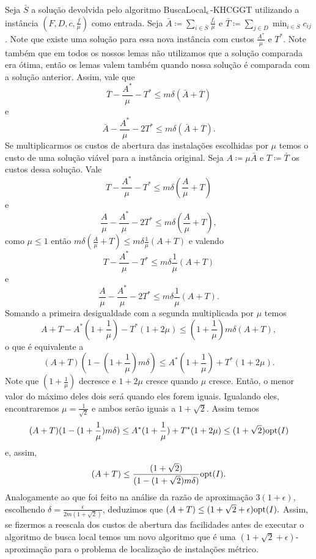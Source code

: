 Seja $\bar{S}$ a solução devolvida pelo algoritmo {\sc BuscaLocal$_\epsilon$-KHCGGT} utilizando a instância $(F,D,c,\frac{f}{\mu})$ como entrada. Seja $\bar{A} \coloneqq \sum_{i \in \bar{S}} \frac{f_i}{\mu}$ e $\bar{T} \coloneqq \sum_{j\in D} \min_{i \in \bar{S}} c_{ij}$. Note que existe uma solução para essa nova instância com custos $\frac{A^*}{\mu}$ e $T^*$. Note também que em todos os nossos lemas não utilizamos  que a solução comparada era ótima, então os lemas valem também quando nossa solução é comparada com a solução anterior. Assim, vale que
\[ \overline{T} - \frac{A^*}{\mu} - T^* \leq m\delta(\bar{A} + \overline{T})\]
e
\[ \bar{A} - \frac{A^*}{\mu} - 2T^* \leq m\delta(\bar{A} + \overline{T}).\]
Se multiplicarmos os custos de abertura das instalações escolhidas por $\mu$ temos o custo de uma solução viável para a instância original. Seja $A \coloneqq \mu\bar{A}$ e $T \coloneqq \bar{T}$ os custos dessa solução. Vale
\[ T - \frac{A^*}{\mu} - T^* \leq m\delta(\frac{A}{\mu}+ T)\]
e
\[ \frac{A}{\mu} - \frac{A^*}{\mu} - 2T^* \leq m\delta(\frac{A}{\mu} + T),\]
como $\mu \leq 1$ então $m\delta(\frac{A}{\mu}+ T) \leq m\delta\frac{1}{\mu}( A + T)$ e valendo 
\[T - \frac{A^*}{\mu} - T^* \leq m\delta\frac{1}{\mu}( A + T) \] 
e 
\[ \frac{A}{\mu} - \frac{A^*}{\mu} - 2T^* \leq m\delta\frac{1}{\mu}( A + T) .\]
Somando a primeira desigualdade com a segunda multiplicada por $\mu$ temos
\[A + T - A^* (1 + \frac{1}{\mu}) - T^*(1 + 2\mu) \leq (1 + \frac{1}{\mu})m\delta(A+T),\]
o que é equivalente a 
\[(A+T)(1 - (1+\frac{1}{\mu})m\delta)\leq A^* (1 + \frac{1}{\mu}) + T^*(1 + 2\mu).\]
Note que $(1+\frac{1}{\mu})$ decresce e $1 + 2\mu$ cresce quando $\mu$ cresce. Então, o menor valor do máximo deles dois será quando eles forem iguais. Igualando eles, encontraremos $\mu = \frac{1}{\sqrt{2}}$ e ambos serão iguais a $1 + \sqrt{2}$. Assim temos
\[(A+T)(1 - (1+\frac{1}{\mu})m\delta)\leq A^* (1 + \frac{1}{\mu}) + T^*(1 + 2\mu) \leq (1+\sqrt{2})\mathrm{opt}(I)\]
e, assim, 
\[(A+T)\leq \frac{(1+\sqrt{2})}{(1 - (1+\sqrt{2 })m\delta)}\mathrm{opt}(I).\]
Analogamente ao que foi feito na análise da razão de aproximação $3(1 + \epsilon)$, escolhendo $\delta = \frac{\epsilon}{2m(1+\sqrt{2})}$, deduzimos que \((A+T) \leq (1 + \sqrt{2} + \epsilon )\mathrm{opt}(I).\)
Assim, se fizermos a reescala dos custos de abertura das facilidades antes de executar o algoritmo de busca local temos um novo algoritmo que é uma $(1 + \sqrt{2} + \epsilon )$-aproximação para o problema de localização de instalações métrico.
